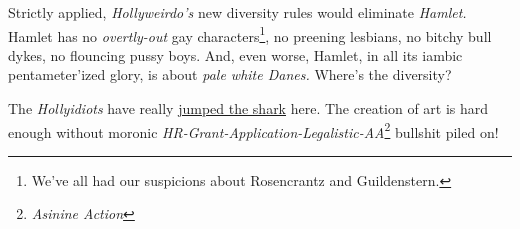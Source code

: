 Strictly applied, \emph{Hollyweirdo's} new diversity rules would
eliminate \emph{Hamlet.} Hamlet has no \emph{overtly-out} gay
characters\footnote{We've all had our suspicions about Rosencrantz and
  Guildenstern.
}, no preening
lesbians, no bitchy bull dykes, no flouncing pussy boys. And, even
worse, Hamlet, in all its iambic pentameter'ized glory, is about
\emph{pale white Danes.} Where's the diversity?

The \emph{Hollyidiots} have really
\href{https://www.urbandictionary.com/define.php?term=jump-the-shark}{jumped
the shark} here. The creation of art is hard enough without moronic
\emph{HR-Grant-Application-Legalistic-AA}\footnote{\emph{Asinine Action}}
bullshit piled on!





%
